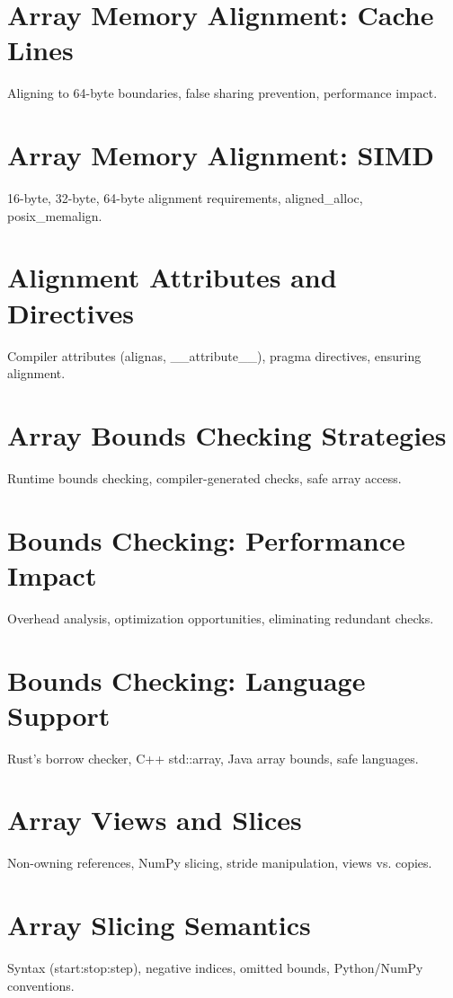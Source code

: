 
\chapter{Array Memory Alignment: Cache Lines}
Aligning to 64-byte boundaries, false sharing prevention, performance impact.

\chapter{Array Memory Alignment: SIMD}
16-byte, 32-byte, 64-byte alignment requirements, aligned\_alloc, posix\_memalign.

\chapter{Alignment Attributes and Directives}
Compiler attributes (alignas, \_\_attribute\_\_), pragma directives, ensuring alignment.

\chapter{Array Bounds Checking Strategies}
Runtime bounds checking, compiler-generated checks, safe array access.

\chapter{Bounds Checking: Performance Impact}
Overhead analysis, optimization opportunities, eliminating redundant checks.

\chapter{Bounds Checking: Language Support}
Rust's borrow checker, C++ std::array, Java array bounds, safe languages.

\chapter{Array Views and Slices}
Non-owning references, NumPy slicing, stride manipulation, views vs. copies.

\chapter{Array Slicing Semantics}
Syntax (start:stop:step), negative indices, omitted bounds, Python/NumPy conventions.

